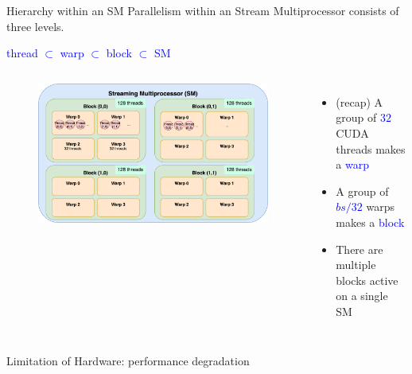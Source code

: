 \documentclass[dvipdfmx, 11pt, aspectratio=169]{beamer}   %
\begin{document}
\begin{frame}{Hierarchy within an SM}
  Parallelism within an Stream Multiprocessor consists of three levels.

  \textcolor{blue}{
  thread $\subset$ warp $\subset$ block $\subset$ SM 
  }
  \begin{columns}
    \begin{figure}
      \includegraphics[scale=0.075]{img/smHierarchy.png}
    \end{figure}
    \begin{itemize}
      \item (recap) A group of \textcolor{blue}{$32$} CUDA threads makes a \textcolor{blue}{warp}
      \item A group of \textcolor{blue}{$bs/32$} warps makes a \textcolor{blue}{block}
      \item There are multiple blocks active on a single SM
    \end{itemize}
  \end{columns}
\end{frame}
\begin{frame}{Limitation of Hardware: performance degradation}

\end{frame}
\end{document}
